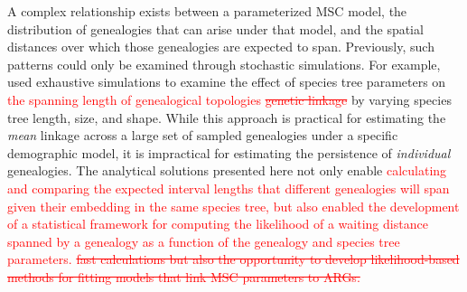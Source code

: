 \documentclass[11pt]{article}
\begin{document}
A complex relationship exists between a parameterized MSC model, 
the distribution of genealogies that can arise under that model, and the 
spatial distances over which those genealogies are expected to span.
Previously, such patterns could only be examined through stochastic simulations. 
For example, \cite{mckenzie_multispecies_2020} used exhaustive simulations to
examine the effect of species tree parameters on 
\textcolor{red}{
the spanning length of genealogical topologies
\sout{genetic linkage}
}
by varying species tree length, size, and shape. 
% 
While this approach is practical for estimating the \emph{mean} linkage across
a large set of sampled genealogies under a specific demographic model, it is
impractical for estimating the persistence of \emph{individual} genealogies. 
The analytical solutions presented here not only enable 
\textcolor{red}{
calculating and comparing the expected interval lengths that different 
genealogies will span given their embedding in the same species tree, 
but also enabled the development of a statistical framework for computing 
the likelihood of a waiting distance spanned by a genealogy 
as a function of the genealogy and species tree parameters.
\sout{
fast calculations but also the opportunity to develop likelihood-based
methods for fitting models that link MSC parameters to ARGs.
}
}
\end{document}
